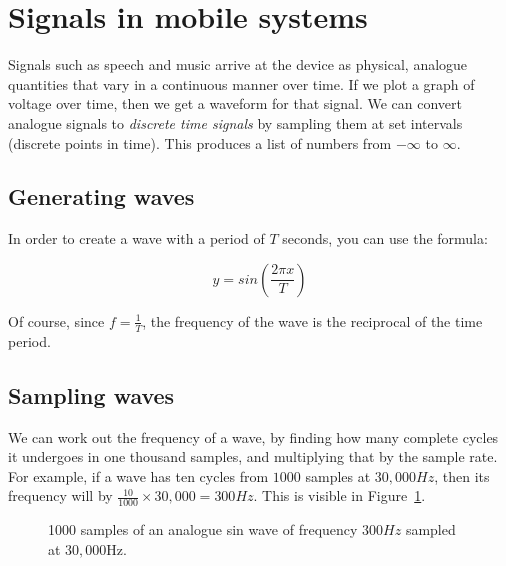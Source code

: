 \section{Signals in mobile systems}

Signals such as speech and music arrive at the device as physical, analogue
quantities that vary in a continuous manner over time. If we plot a graph of
voltage over time, then we get a waveform for that signal. We can convert
analogue signals to \textit{discrete time signals} by sampling them at set
intervals (discrete points in time). This produces a list of numbers from
$-\infty$ to $\infty$.

\subsection{Generating waves}

In order to create a wave with a period of $T$ seconds, you can use the formula:

\[
  y = sin(\frac{2\pi x}{T})
\]

Of course, since $f = \frac{1}{T}$, the frequency of the wave is the reciprocal
of the time period.

\subsection{Sampling waves}

We can work out the frequency of a wave, by finding how many complete cycles it
undergoes in one thousand samples, and multiplying that by the sample rate. For
example, if a wave has ten cycles from $1000$ samples at $30,000Hz$, then its
frequency will by $\frac{10}{1000} \times 30,000 = 300Hz$. This is visible in
Figure~\ref{discrete-signal}.


\begin{figure}[ht]
  \centering
  \caption{1000 samples of an analogue sin wave of frequency $300Hz$ sampled at
  $30,000$Hz.}
  \label{discrete-signal}
\end{figure} 

